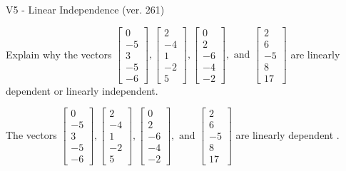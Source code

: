 \begin{exercise}
  \begin{exerciseTitle}V5 - Linear Independence (ver. 261)\end{exerciseTitle}
  \begin{exerciseStatement}
    Explain why the vectors \(\left[\begin{array}{r}
0 \\
-5 \\
3 \\
-5 \\
-6
\end{array}\right] , \left[\begin{array}{r}
2 \\
-4 \\
1 \\
-2 \\
5
\end{array}\right] , \left[\begin{array}{r}
0 \\
2 \\
-6 \\
-4 \\
-2
\end{array}\right] , \text{ and } \left[\begin{array}{r}
2 \\
6 \\
-5 \\
8 \\
17
\end{array}\right]\) are linearly dependent or linearly independent.	


  \end{exerciseStatement}
  \begin{exerciseAnswer}
   The vectors \(\left[\begin{array}{r}
0 \\
-5 \\
3 \\
-5 \\
-6
\end{array}\right] , \left[\begin{array}{r}
2 \\
-4 \\
1 \\
-2 \\
5
\end{array}\right] , \left[\begin{array}{r}
0 \\
2 \\
-6 \\
-4 \\
-2
\end{array}\right] , \text{ and } \left[\begin{array}{r}
2 \\
6 \\
-5 \\
8 \\
17
\end{array}\right]\) are 
  	 linearly dependent  .
  


  \end{exerciseAnswer}
\end{exercise}